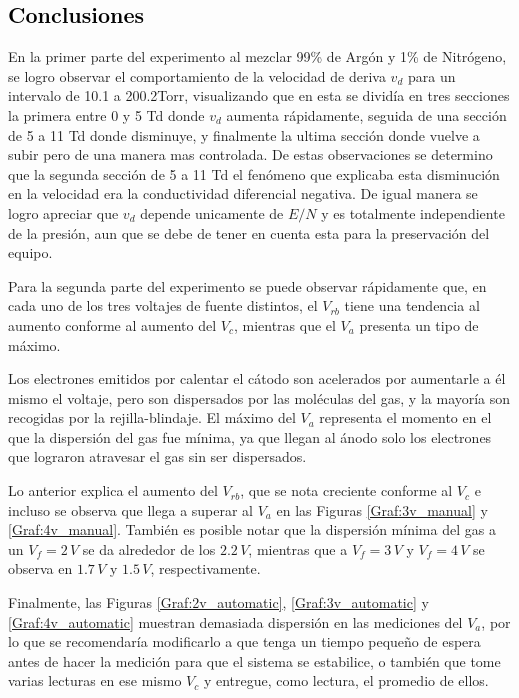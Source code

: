 \textcolor{black}{\section{Conclusiones}}

En la primer parte del experimento al mezclar 99\% de Argón y 1\% de Nitrógeno, se logro observar el comportamiento de la velocidad de deriva $v_d$ para un intervalo de 10.1 a 200.2Torr, visualizando que en esta se dividía en tres secciones la primera entre  0 y 5 Td donde $v_d$ aumenta rápidamente, seguida de una sección de 5 a 11 Td donde disminuye, y finalmente la ultima sección donde vuelve a subir pero de una manera mas controlada. De estas observaciones se determino que la segunda sección de 5 a 11 Td el fenómeno que explicaba esta disminución en la velocidad era la conductividad diferencial negativa.
 De igual manera se logro apreciar que $v_d$ depende unicamente de $E/N$ y es totalmente independiente de la presión, aun que se debe de tener en cuenta esta para la preservación del equipo. 


\noindent Para la segunda parte del experimento se puede observar rápidamente que, en cada uno de los tres voltajes de fuente distintos, el $V_{rb}$ tiene una tendencia al aumento conforme al aumento del $V_c$, mientras que el $V_a$ presenta un tipo de máximo.

Los electrones emitidos por calentar el cátodo son acelerados por aumentarle a él mismo el voltaje, pero son dispersados por las moléculas del gas, y la mayoría son recogidas por la rejilla-blindaje. El máximo del $V_a$ representa el momento en el que la dispersión del gas fue mínima, ya que llegan al ánodo solo los electrones que lograron atravesar el gas sin ser dispersados.

Lo anterior explica el aumento del $V_{rb}$, que se nota creciente conforme al $V_c$ e incluso se observa que llega a superar al $V_a$ en las Figuras \ref{Graf:3v_manual} y \ref{Graf:4v_manual}. También es posible notar que la dispersión mínima del gas a un $V_f = 2\,V$ se da alrededor de los $2.2\,V$, mientras que a $V_f = 3\,V$ y $V_f = 4\,V$ se observa en $1.7\,V$ y $1.5\,V$, respectivamente.

Finalmente, las Figuras \ref{Graf:2v_automatic}, \ref{Graf:3v_automatic} y \ref{Graf:4v_automatic} muestran demasiada dispersión en las mediciones del $V_a$, por lo que se recomendaría modificarlo a que tenga un tiempo pequeño de espera antes de hacer la medición para que el sistema se estabilice, o también que tome varias lecturas en ese mismo $V_c$ y entregue, como lectura, el promedio de ellos.